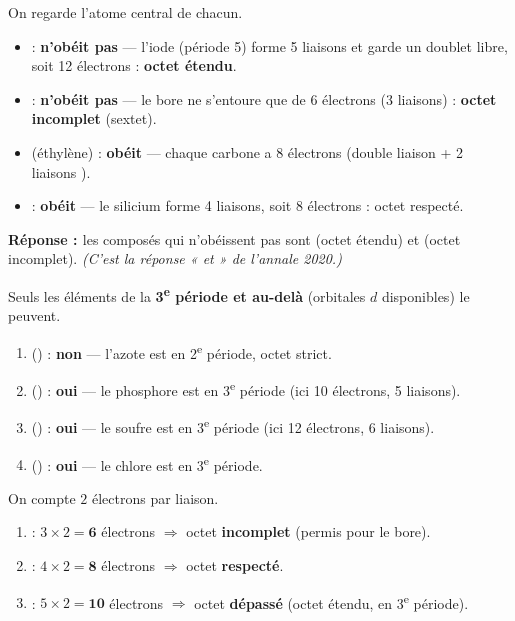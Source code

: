 \documentclass[11pt,a4paper]{article}
\newcommand{\rep}{\textbf{\textcolor{corcol}{Réponse : }}}
\begin{document}
\begin{cor}
On regarde l'atome central de chacun.
\begin{itemize}[leftmargin=1.6em,itemsep=1pt]
  \item {} : \textbf{n'obéit pas} — l'iode (période 5) forme 5 liaisons et garde un doublet
        libre, soit 12 électrons : \textbf{octet étendu}.
  \item {} : \textbf{n'obéit pas} — le bore ne s'entoure que de 6 électrons (3 liaisons) :
        \textbf{octet incomplet} (sextet).
  \item {} (éthylène) : \textbf{obéit} — chaque carbone a 8 électrons (double liaison
         + 2 liaisons ).
  \item {} : \textbf{obéit} — le silicium forme 4 liaisons, soit 8 électrons : octet respecté.
\end{itemize}
\rep les composés qui n'obéissent pas sont \textbf{} (octet étendu) et \textbf{}
(octet incomplet). \emph{(C'est la réponse «  et  » de l'annale 2020.)}
\end{cor}

\begin{cor}
Seuls les éléments de la \textbf{3\textsuperscript{e} période et au-delà} (orbitales $d$
disponibles) le peuvent.
\begin{enumerate}[label=\alph*),leftmargin=2em,itemsep=1pt]
  \item {} () : \textbf{non} — l'azote est en 2\textsuperscript{e} période, octet strict.
  \item {} () : \textbf{oui} — le phosphore est en 3\textsuperscript{e} période
        (ici 10 électrons, 5 liaisons).
  \item {} () : \textbf{oui} — le soufre est en 3\textsuperscript{e} période
        (ici 12 électrons, 6 liaisons).
  \item {} () : \textbf{oui} — le chlore est en 3\textsuperscript{e} période.
\end{enumerate}
\end{cor}

\begin{cor}
On compte $2$ électrons par liaison.
\begin{enumerate}[label=\alph*),leftmargin=2em,itemsep=1pt]
  \item {} : $3\times 2 = \mathbf{6}$ électrons $\Rightarrow$ octet \textbf{incomplet}
        (permis pour le bore).
  \item {} : $4\times 2 = \mathbf{8}$ électrons $\Rightarrow$ octet \textbf{respecté}.
  \item {} : $5\times 2 = \mathbf{10}$ électrons $\Rightarrow$ octet \textbf{dépassé}
        (octet étendu,  en 3\textsuperscript{e} période).
\end{enumerate}
\end{cor}
\end{document}
